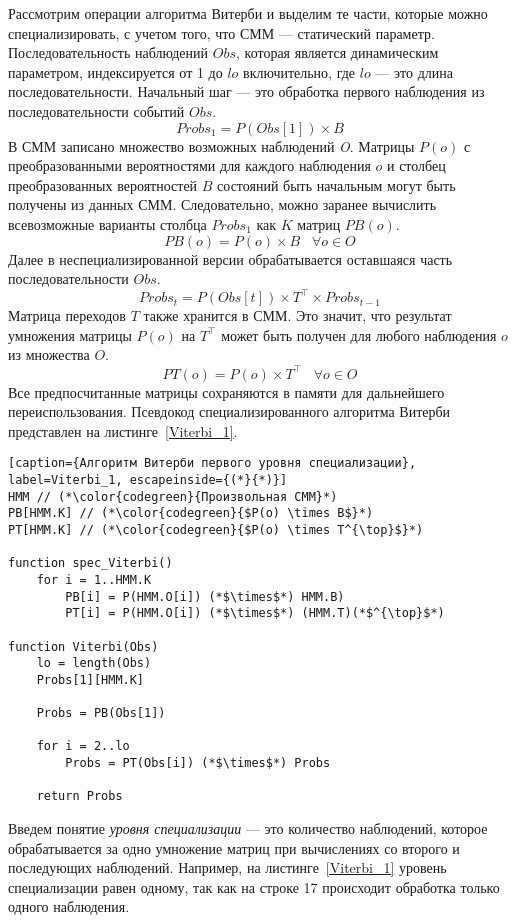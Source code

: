 Рассмотрим операции алгоритма Витерби и выделим те части, которые можно специализировать, с учетом того, что 
СММ --- статический параметр.
Последовательность наблюдений $Obs$, которая является 
динамическим параметром, индексируется от 1 до $lo$ 
включительно, где $lo$ --- это длина последовательности.
Начальный шаг --- это обработка первого наблюдения из 
последовательности событий $Obs$.
\[Probs_{1} = P(Obs[1]) \times B\]
В СММ записано множество возможных наблюдений \emph{O}.
Матрицы $P(o)$ с преобразованными вероятностями для каждого 
наблюдения $o$ и столбец преобразованных вероятностей 
$B$ состояний быть начальным могут быть
получены из данных СММ.
Следовательно, можно заранее вычислить всевозможные варианты 
столбца $Probs_{1}$ как $K$ матриц $PB(o)$. 
\[PB(o) = P(o) \times B \;\;\; \forall o \in O\]
Далее в неспециализированной версии обрабатывается оставшаяся 
часть последовательности $Obs$.
\[Probs_{t} = P(Obs[t]) \times T^{\top} \times Probs_{t - 1}\]
Матрица переходов $T$ также хранится в СММ.
Это значит, что результат умножения матрицы $P(o)$ на 
$T^{\top}$ может быть получен для любого наблюдения $o$ из 
множества $O$.
\[PT(o) = P(o) \times T^{\top} \;\;\; \forall o \in O\]
Все предпосчитанные матрицы сохраняются в памяти для 
дальнейшего переиспользования.
Псевдокод специализированного алгоритма Витерби представлен 
на листинге~\ref{Viterbi_1}.
\begin{lstlisting}[caption={Алгоритм Витерби первого уровня специализации}, label=Viterbi_1, escapeinside={(*}{*)}]
HMM // (*\color{codegreen}{Произвольная СММ}*)
PB[HMM.K] // (*\color{codegreen}{$P(o) \times B$}*)
PT[HMM.K] // (*\color{codegreen}{$P(o) \times T^{\top}$}*)

function spec_Viterbi()
	for i = 1..HMM.K
		PB[i] = P(HMM.O[i]) (*$\times$*) HMM.B)
		PT[i] = P(HMM.O[i]) (*$\times$*) (HMM.T)(*$^{\top}$*)

function Viterbi(Obs)
	lo = length(Obs)
	Probs[1][HMM.K]

	Probs = PB(Obs[1])
	
	for i = 2..lo
		Probs = PT(Obs[i]) (*$\times$*) Probs
		
	return Probs
\end{lstlisting}

Введем понятие \emph{уровня специализации} --- это количество 
наблюдений, которое обрабатывается за одно умножение матриц 
при вычислениях со второго и последующих наблюдений.
Например, на листинге~\ref{Viterbi_1} уровень специализации 
равен одному, так как на строке 17 происходит обработка 
только одного наблюдения.

